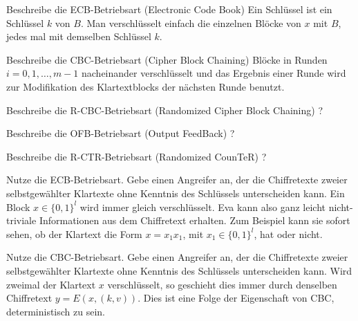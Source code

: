 \documentclass[avery5371, frame]{flashcards}
\begin{document}
\begin{flashcard}[Betriebsarten]{Beschreibe die ECB-Betriebsart (Electronic Code Book)}
    Ein Schlüssel ist ein Schlüssel $k$ von $B$. Man verschlüsselt einfach die einzelnen Blöcke von $x$ mit $B$, jedes mal mit demselben Schlüssel $k$.

\end{flashcard}

\begin{flashcard}[Betriebsarten]{Beschreibe die CBC-Betriebsart (Cipher Block Chaining)}
    Blöcke in Runden $i=0, 1 ,\dots,m-1$ nacheinander verschlüsselt und das Ergebnis einer Runde wird zur Modifikation des Klartextblocks der nächsten Runde benutzt.
\end{flashcard}

\begin{flashcard}[Betriebsarten]{Beschreibe die R-CBC-Betriebsart (Randomized Cipher Block Chaining)}
    ?
\end{flashcard}

\begin{flashcard}[Betriebsarten]{Beschreibe die OFB-Betriebsart (Output FeedBack)}
    ?
\end{flashcard}

\begin{flashcard}[Betriebsarten]{Beschreibe die R-CTR-Betriebsart (Randomized CounTeR)}
    ?
\end{flashcard}

\begin{flashcard}[Betriebsarten]{Nutze die ECB-Betriebsart. Gebe einen Angreifer an, der die Chiffretexte zweier selbstgewählter Klartexte ohne Kenntnis des Schlüssels unterscheiden kann.}
    Ein Block $x\in\{0,1\}^l$ wird immer gleich verschlüsselt. Eva kann also ganz leicht nicht-triviale Informationen aus dem Chiffretext erhalten.
    Zum Beispiel kann sie sofort sehen, ob der Klartext die Form $x=x_1 x_1$, mit $x_1\in\{0,1\}^l$, hat oder nicht.
\end{flashcard}

\begin{flashcard}[Betriebsarten]{Nutze die CBC-Betriebsart. Gebe einen Angreifer an, der die Chiffretexte zweier selbstgewählter Klartexte ohne Kenntnis des Schlüssels unterscheiden kann.}
    Wird zweimal der Klartext $x$ verschlüsselt, so geschieht dies immer durch denselben Chiffretext $y=E(x,(k,v))$. Dies ist eine Folge der Eigenschaft von CBC, deterministisch zu sein.
\end{flashcard}
\end{document}
